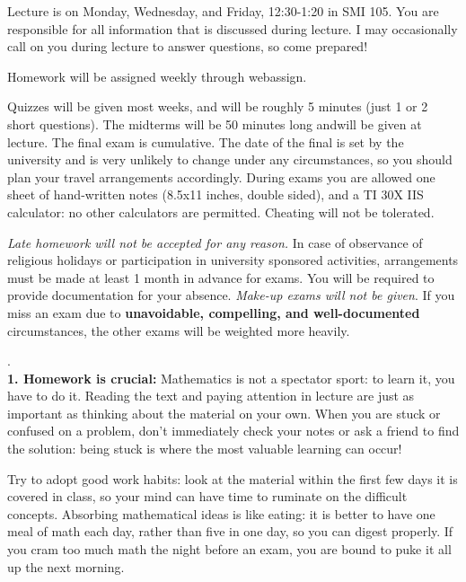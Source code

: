 \documentclass[11 pt]{report}
\begin{document}
\vspace{0.25cm}

  Lecture is on Monday, Wednesday, and Friday, 12:30-1:20 in SMI 105.  You
are responsible for all information that is discussed
during lecture. I may occasionally call on you during lecture to answer questions, so come prepared!
\vspace{0.25cm}

  Homework will be assigned weekly through webassign. 
\vspace{0.25cm}


  Quizzes will be given most weeks, and will be roughly 5 minutes (just 1 or 2 short questions). The midterms will be 50 minutes long andwill be given at lecture.  The final exam is cumulative. The date of the final is set by the university and is very unlikely to change under any circumstances, so you should plan your travel arrangements accordingly. During exams you are allowed one sheet of hand-written notes (8.5x11 inches, double sided), and a TI 30X IIS calculator: no other calculators are permitted. Cheating will not be tolerated. 

\vspace{.25cm}

  \emph{Late homework will not be accepted
for any reason.}  In case of observance of religious holidays or
participation in university sponsored activities, arrangements must
be made at least 1 month in advance for exams. You will be required
to provide documentation for your absence. \emph{Make-up exams will
not be given}.  If you miss an exam due to {\bf unavoidable,
compelling, and well-documented} circumstances, the other exams will
be weighted more heavily. \vspace{0.25cm}

\newpage 

. \\
{\bf1.  Homework is crucial:} Mathematics is not a spectator sport: to learn it, you have to do it.
Reading the text and paying attention in lecture are just as important as thinking about
the material on your own. When you are stuck or confused on a problem, don't immediately check your notes or 
ask a friend to find the solution: being stuck is where the most valuable learning can occur! 

\vspace{.2cm}

\noindent Try to adopt good work habits: look at
the material within the first few days it is covered in class, so your mind can have time to ruminate on the difficult concepts.
Absorbing mathematical ideas is like eating: it is better to have one meal of math each day, rather than five in one day, so you can digest properly. If you cram too much math the night before an exam, you are bound to puke it all up the next morning.  
\end{document}
